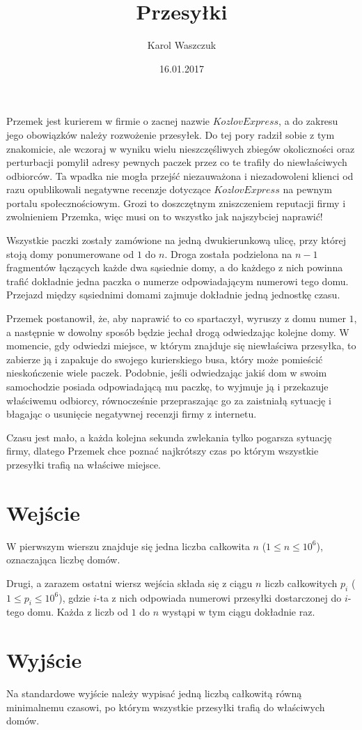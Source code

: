 \documentclass[zad,zawodnik,utf8]{sinol}
\title{Przesyłki}
\author{Karol Waszczuk} %
\date{16.01.2017}
\begin{document}
\begin{tasktext}%

Przemek jest kurierem w firmie o zacnej nazwie $KozlovExpress$, a do zakresu jego obowiązków należy rozwożenie przesyłek. Do tej pory radził sobie z tym znakomicie, ale wczoraj w wyniku wielu nieszczęśliwych zbiegów okoliczności oraz perturbacji pomylił adresy pewnych paczek przez co te trafiły do niewłaściwych odbiorców. Ta wpadka nie mogła przejść niezauważona i niezadowoleni klienci od razu opublikowali negatywne recenzje dotyczące $KozlovExpress$ na pewnym portalu społecznościowym. Grozi to doszczętnym zniszczeniem reputacji firmy i zwolnieniem Przemka, więc musi on to wszystko jak najszybciej naprawić!

Wszystkie paczki zostały zamówione na jedną dwukierunkową ulicę, przy której stoją domy ponumerowane od $1$ do $n$. Droga została podzielona na $n - 1$ fragmentów łączących każde dwa sąsiednie domy, a do każdego z nich powinna trafić dokładnie jedna paczka o numerze odpowiadającym numerowi tego domu. Przejazd między sąsiednimi domami zajmuje dokładnie jedną jednostkę czasu.

Przemek postanowił, że, aby naprawić to co spartaczył, wyruszy z domu numer $1$, a następnie w dowolny sposób będzie jechał drogą odwiedzając kolejne domy. W momencie, gdy odwiedzi miejsce, w którym znajduje się niewłaściwa przesyłka, to zabierze ją i zapakuje do swojego kurierskiego busa, który może pomieścić nieskończenie wiele paczek. Podobnie, jeśli odwiedzając jakiś dom w swoim samochodzie posiada odpowiadającą mu paczkę, to wyjmuje ją i przekazuje właściwemu odbiorcy, równocześnie przepraszając go za zaistniałą sytuację i błagając o usunięcie negatywnej recenzji firmy z internetu. 

Czasu jest mało, a każda kolejna sekunda zwlekania tylko pogarsza sytuację firmy, dlatego Przemek chce poznać najkrótszy czas po którym wszystkie przesyłki trafią na właściwe miejsce.

  \section{Wejście}
W pierwszym wierszu znajduje się jedna liczba całkowita $n$ ($1 \leq n \leq 10^6$), oznaczająca liczbę domów.

Drugi, a zarazem ostatni wiersz wejścia składa się z ciągu $n$ liczb całkowitych $p_i$ ($1 \leq p_i \leq 10^6$), gdzie $i$-ta z nich odpowiada numerowi przesyłki dostarczonej do $i$-tego domu. Każda z liczb od $1$ do $n$ wystąpi w tym ciągu dokładnie raz.

  \section{Wyjście}
Na standardowe wyjście należy wypisać jedną liczbą całkowitą równą minimalnemu czasowi, po którym wszystkie przesyłki trafią do właściwych domów.

\makecompactexample
\end{tasktext}
\end{document}
